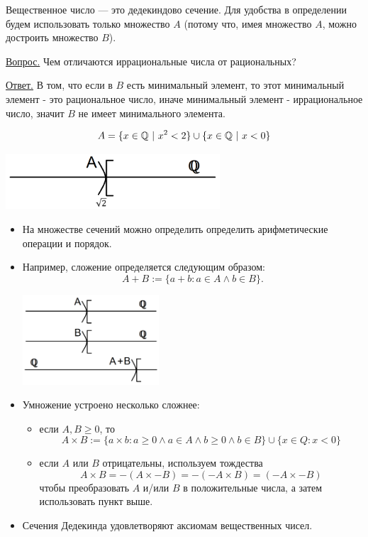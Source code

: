 	\begin{definition}
		Вещественное число — это дедекиндово сечение. Для удобства в определении будем использовать только множество $A$ (потому что, имея множество $A$, можно достроить множество $B$).
	\end{definition}
	
	\underline{Вопрос.} Чем отличаются иррациональные числа от рациональных?
	
	\underline{Ответ.} В том, что если в $B$ есть минимальный элемент, то этот минимальный элемент - это рациональное число, иначе минимальный элемент - иррациональное число, значит $B$ не имеет минимального элемента.
	
	\[ A = \{x \in \mathbb Q \text{ } | \text{ } x^2 < 2\} \cup \{x \in \mathbb Q \text{ } | \text{ } x < 0\} \]
	
	\begin{center}
		\includegraphics[width=0.6\textwidth]{img/lecture1/sqrt_of_two}
	\end{center}
	
	\begin{itemize}
		\item На множестве сечений можно определить определить арифметические операции и порядок. 
		\item Например, сложение определяется следующим образом:
	     \[ A + B := \{a + b : a \in A \wedge b  \in B\}. \]
	     \begin{center}
	     	\includegraphics[width=0.4\textwidth]{img/lecture1/addition}
	     \end{center}
	    \item Умножение устроено несколько сложнее:
		\begin{itemize}
		    \item если $A, B \geqslant 0$, то
		    \[ A \times B := \{a \times b : a \geqslant 0 \wedge a \in A \wedge b  \geqslant 0 \wedge b \in B\} \cup \{x \in Q : x < 0\} \]
		    \item если $A$ или $B$ отрицательны, используем тождества 
		    \[ A \times B = -(A \times -B) = -(-A \times B) = (-A \times -B) \] чтобы преобразовать $A$ и/или $B$ в положительные числа, а затем использовать пункт выше.
		\end{itemize}
		\item Сечения Дедекинда удовлетворяют аксиомам вещественных чисел.
	\end{itemize}
	
